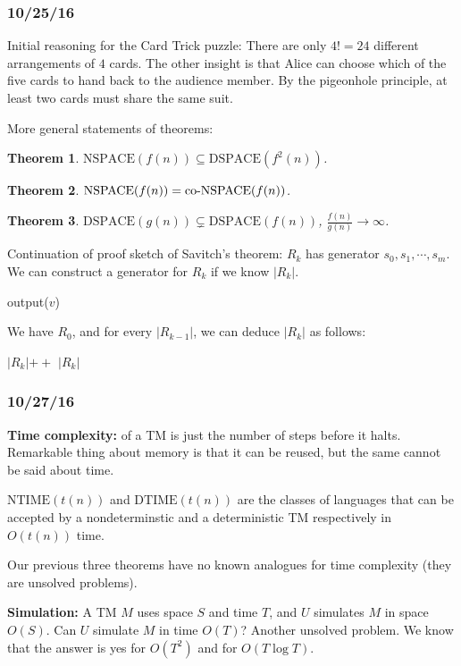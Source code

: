 \documentclass[a4paper,12pt]{article}
\newtheorem{theorem}{Theorem}
\theoremstyle{remark}
\theoremstyle{definition}
\begin{document}
\subsubsection*{10/25/16}
Initial reasoning for the Card Trick puzzle: There are only $4! = 24$ different arrangements of $4$ cards. The other insight is that Alice can choose which of the five cards to hand back to the audience member. By the pigeonhole principle, at least two cards must share the same suit. \par
More general statements of theorems:
\setcounter{theorem}{2}
\begin{theorem}
    $\text{NSPACE}(f(n)) \subseteq \text{DSPACE}(f^2(n))$.
\end{theorem}
\begin{theorem}
    $\text{NSPACE}(f(n)) = \text{co\text{-}NSPACE}(f(n))$.
\end{theorem}
\begin{theorem}
    $\text{DSPACE}(g(n)) \subsetneq \text{DSPACE}(f(n))$, $\frac{f(n)}{g(n)} \to \infty$.
\end{theorem}
\noindent Continuation of proof sketch of Savitch's theorem: $R_k$ has generator $s_0, s_1, \cdots, s_m$. We can construct a generator for $R_k$ if we know $|R_k|$.
\begin{algorithm}[H] {\begin{algorithmic}[1]
            \State output($v$)
        \EndIf
    \EndFor
\end{algorithmic}} \end{algorithm}
We have $R_0$, and for every $|R_{k - 1}|$, we can deduce $|R_k|$ as follows:
\begin{algorithm}[H] {\begin{algorithmic}[1]
            \State $|R_k|{++}$
        \EndIf
    \EndFor
    \State \Return $|R_k|$
\end{algorithmic}} \end{algorithm}

\subsubsection*{10/27/16}
\textbf{Time complexity:}
of a TM is just the number of steps before it halts. Remarkable thing about memory is that it can be reused, but the same cannot be said about time. \par
$\text{NTIME}(t(n))$ and $\text{DTIME}(t(n))$ are the classes of languages that can be accepted by a nondeterminstic and a deterministic TM respectively in $O(t(n))$ time. \par
Our previous three theorems have no known analogues for time complexity (they are unsolved problems). \par
\textbf{Simulation:} A TM $M$ uses space $S$ and time $T$, and $U$ simulates $M$ in space $O(S)$. Can $U$ simulate $M$ in time $O(T)$? Another unsolved problem. We know that the answer is yes for $O(T^2)$ and for $O(T \log T)$.
\end{document}
